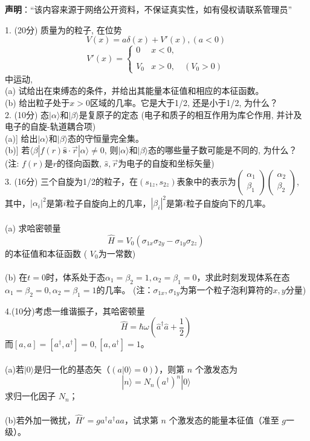 
\textbf{声明}：“该内容来源于网络公开资料，不保证真实性，如有侵权请联系管理员”

1. (20分) 质量为的粒子, 在位势
$$V(x) = a \delta (x) + V'(x), (a < 0)~$$
$$V'(x) = \begin{cases} 0 & x < 0, \\\\ V_0 & x > 0,\quad (V_0 > 0)\end{cases}~$$
中运动,\\
(a) 试给出在束缚态的条件，并给出其能量本征值和相应的本征函数。\\
(b) 给出粒子处于$ x > 0 $区域的几率。它是大于1/2, 还是小于1/2, 为什么？\\

2. (10分) 态$|\alpha\rangle$和$|\beta\rangle$是复原子的定态 (电子和质子的相互作用为库仑作用, 并计及电子的自旋-轨道耦合项)\\
(a)] 给出$|\alpha\rangle$和$|\beta\rangle$态的守恒量完全集。\\
(b)] 若$\langle \beta | f({r}) \hat{\mathbf{s}} \cdot \vec{r} | \alpha \rangle \neq 0$, 则$|\alpha\rangle$和$|\beta\rangle$态的哪些量子数可能是不同的, 为什么？\\
(注: $f({r})$是$r$的径向函数, $\hat{s},\vec{r}$为电子的自旋和坐标矢量)\\

3. (16分) 三个自旋为1/2的粒子，在$(s_{1z}, s_{2z})$表象中的表示为$\begin{pmatrix} \alpha_1 \\ \beta_1 \end{pmatrix} \begin{pmatrix} \alpha_2 \\ \beta_2 \end{pmatrix}$, 其中，$\left|\alpha_i\right|^2$是第$i$粒子自旋向上的几率，$\left|\beta_i\right|^2$是第$i$粒子自旋向下的几率。\\\\
(a) 求哈密顿量 
$$\hat{H} = V_0 (\sigma_{1x} \sigma_{2y} - \sigma_{1y} \sigma_{2z})~$$
    的本征值和本征函数 ( $V_0$为一常数)\\\\
(b) 在$t=0$时，体系处于态$\alpha_1 = \beta_2 = 1, \alpha_2 = \beta_1 = 0$，求此时刻发现体系在态$\alpha_1 = \beta_2 = 0, \alpha_2 = \beta_1 = 1$的几率。
    (注：$\sigma_{1x}, \sigma_{1y}$为第一个粒子泡利算符的$x,y$分量)

4.(10分)考虑一维谐振子，其哈密顿量
$$\hat{H} = \hbar \omega \left( \hat{a}^\dagger \hat{a} + \frac{1}{2} \right)~$$
    而$[a, a] = [a^\dagger, a^\dagger] = 0, [a, a^\dagger] = 1$。\\\\
(a)若$|0\rangle$是归一化的基态矢（$(a|0\rangle = 0)$），则第 $n$ 个激发态为
$$|n\rangle = N_n (a^\dagger)^n |0\rangle~$$
        求归一化因子 $N_n$；\\\\
(b)若外加一微扰，$\hat{H}' = g a^\dagger a^\dagger a a$，试求第 $n$ 个激发态的能量本征值（准至 $g$一级）。

